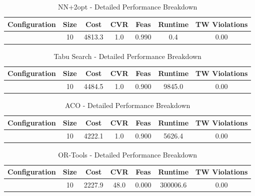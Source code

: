 \begin{table}[ht]
\centering
\caption{NN+2opt - Detailed Performance Breakdown}
\label{tab:nnplus2opt_breakdown}
\begin{tabular}{lcccccc}
\toprule
\textbf{Configuration} & \textbf{Size} & \textbf{Cost} & \textbf{CVR} & \textbf{Feas} & \textbf{Runtime} & \textbf{TW Violations} \\
\midrule
 & 10 & 4813.3 & 1.0 & 0.990 & 0.4 & 0.00 \\
\bottomrule
\end{tabular}
\end{table}

\begin{table}[ht]
\centering
\caption{Tabu Search - Detailed Performance Breakdown}
\label{tab:tabu_search_breakdown}
\begin{tabular}{lcccccc}
\toprule
\textbf{Configuration} & \textbf{Size} & \textbf{Cost} & \textbf{CVR} & \textbf{Feas} & \textbf{Runtime} & \textbf{TW Violations} \\
\midrule
 & 10 & 4484.5 & 1.0 & 0.900 & 9845.0 & 0.00 \\
\bottomrule
\end{tabular}
\end{table}

\begin{table}[ht]
\centering
\caption{ACO - Detailed Performance Breakdown}
\label{tab:aco_breakdown}
\begin{tabular}{lcccccc}
\toprule
\textbf{Configuration} & \textbf{Size} & \textbf{Cost} & \textbf{CVR} & \textbf{Feas} & \textbf{Runtime} & \textbf{TW Violations} \\
\midrule
 & 10 & 4222.1 & 1.0 & 0.900 & 5626.4 & 0.00 \\
\bottomrule
\end{tabular}
\end{table}

\begin{table}[ht]
\centering
\caption{OR-Tools - Detailed Performance Breakdown}
\label{tab:or-tools_breakdown}
\begin{tabular}{lcccccc}
\toprule
\textbf{Configuration} & \textbf{Size} & \textbf{Cost} & \textbf{CVR} & \textbf{Feas} & \textbf{Runtime} & \textbf{TW Violations} \\
\midrule
 & 10 & 2227.9 & 48.0 & 0.000 & 300006.6 & 0.00 \\
\bottomrule
\end{tabular}
\end{table}

